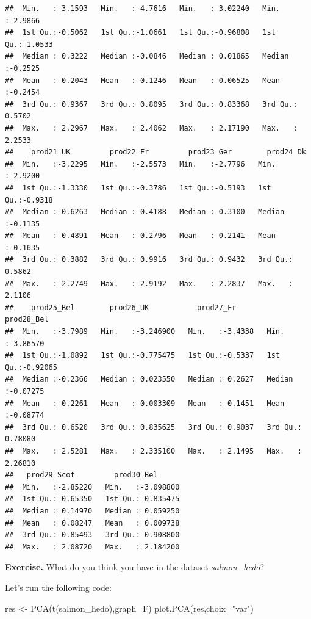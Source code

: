 \documentclass[
]{book}
\newenvironment{Shaded}{\begin{snugshade}}{\end{snugshade}}
\newcommand{\AttributeTok}[1]{\textcolor[rgb]{0.77,0.63,0.00}{#1}}
\newcommand{\FunctionTok}[1]{\textcolor[rgb]{0.00,0.00,0.00}{#1}}
\newcommand{\NormalTok}[1]{#1}
\newcommand{\OtherTok}[1]{\textcolor[rgb]{0.56,0.35,0.01}{#1}}
\newcommand{\StringTok}[1]{\textcolor[rgb]{0.31,0.60,0.02}{#1}}
\begin{document}
\begin{verbatim}
##  Min.   :-3.1593   Min.   :-4.7616   Min.   :-3.02240   Min.   :-2.9866  
##  1st Qu.:-0.5062   1st Qu.:-1.0661   1st Qu.:-0.96808   1st Qu.:-1.0533  
##  Median : 0.3222   Median :-0.0846   Median : 0.01865   Median :-0.2525  
##  Mean   : 0.2043   Mean   :-0.1246   Mean   :-0.06525   Mean   :-0.2454  
##  3rd Qu.: 0.9367   3rd Qu.: 0.8095   3rd Qu.: 0.83368   3rd Qu.: 0.5702  
##  Max.   : 2.2967   Max.   : 2.4062   Max.   : 2.17190   Max.   : 2.2533  
##    prod21_UK         prod22_Fr         prod23_Ger        prod24_Dk      
##  Min.   :-3.2295   Min.   :-2.5573   Min.   :-2.7796   Min.   :-2.9200  
##  1st Qu.:-1.3330   1st Qu.:-0.3786   1st Qu.:-0.5193   1st Qu.:-0.9318  
##  Median :-0.6263   Median : 0.4188   Median : 0.3100   Median :-0.1135  
##  Mean   :-0.4891   Mean   : 0.2796   Mean   : 0.2141   Mean   :-0.1635  
##  3rd Qu.: 0.3882   3rd Qu.: 0.9916   3rd Qu.: 0.9432   3rd Qu.: 0.5862  
##  Max.   : 2.2749   Max.   : 2.9192   Max.   : 2.2837   Max.   : 2.1106  
##    prod25_Bel        prod26_UK           prod27_Fr         prod28_Bel      
##  Min.   :-3.7989   Min.   :-3.246900   Min.   :-3.4338   Min.   :-3.86570  
##  1st Qu.:-1.0892   1st Qu.:-0.775475   1st Qu.:-0.5337   1st Qu.:-0.92065  
##  Median :-0.2366   Median : 0.023550   Median : 0.2627   Median :-0.07275  
##  Mean   :-0.2261   Mean   : 0.003309   Mean   : 0.1451   Mean   :-0.08774  
##  3rd Qu.: 0.6520   3rd Qu.: 0.835625   3rd Qu.: 0.9037   3rd Qu.: 0.78080  
##  Max.   : 2.5281   Max.   : 2.335100   Max.   : 2.1495   Max.   : 2.26810  
##   prod29_Scot         prod30_Bel       
##  Min.   :-2.85220   Min.   :-3.098800  
##  1st Qu.:-0.65350   1st Qu.:-0.835475  
##  Median : 0.14970   Median : 0.059250  
##  Mean   : 0.08247   Mean   : 0.009738  
##  3rd Qu.: 0.85493   3rd Qu.: 0.908800  
##  Max.   : 2.08720   Max.   : 2.184200
\end{verbatim}

\textbf{Exercise. }What do you think you have in the dataset \emph{salmon\_hedo}?

Let's run the following code:

\begin{Shaded}
\begin{Highlighting}[]
\NormalTok{res }\OtherTok{\textless{}{-}} \FunctionTok{PCA}\NormalTok{(}\FunctionTok{t}\NormalTok{(salmon\_hedo),}\AttributeTok{graph=}\NormalTok{F)}
\FunctionTok{plot.PCA}\NormalTok{(res,}\AttributeTok{choix=}\StringTok{"var"}\NormalTok{)}
\end{Highlighting}
\end{Shaded}
\end{document}
